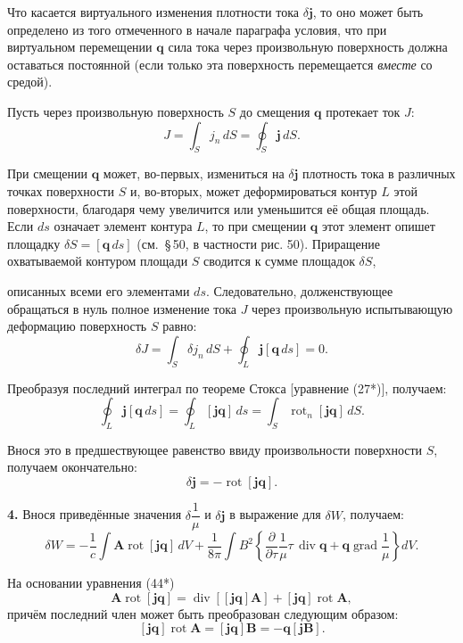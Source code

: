 \documentclass[a4paper,10pt]{article}
\begin{document}
Что касается виртуального изменения плотности тока $\delta\mathbf{j}$,
то оно может быть определено из того отмеченного в начале параграфа
условия, что при виртуальном перемещении $\mathbf{q}$ сила тока через
произвольную поверхность должна оставаться постоянной (если только эта
поверхность перемещается \textit{вместе} со средой).

Пусть через произвольную поверхность $S$ до смещения $\mathbf{q}$
протекает ток $J$:
$$
    J = \int_S j_n\,dS = \oint_S \mathbf{j}\,dS.
$$

При смещении $\mathbf{q}$ может, во-первых, измениться на $\delta\mathbf{j}$
плотность тока в различных точках поверхности $S$ и, во-вторых, может
деформироваться контур $L$ этой поверхности, благодаря чему увеличится
или уменьшится её общая площадь. Если $ds$ означает элемент контура $L$,
то при смещении $\mathbf{q}$ этот элемент опишет площадку $\delta S =
[\mathbf{q}\,ds]$ (см.\ §\,50, в частности рис. 50). Приращение охватываемой
контуром площади $S$ сводится к сумме площадок $\delta S$,


описанных всеми его элементами $ds$. Следовательно, долженствующее
обращаться в нуль полное изменение тока $J$ через произвольную
испытывающую деформацию поверхность $S$ равно:
$$
    \delta J = \int_S \delta j_n\,dS + \oint_L \mathbf{j}[\mathbf{q}\,ds] = 0.
$$

Преобразуя последний интеграл по теореме Стокса [уравнение (27*)],
получаем:
$$
    \oint_L \mathbf{j}[\mathbf{q}\,ds]
    = \oint_L [\mathbf{j}\mathbf{q}]\,ds
    = \int_S \operatorname{rot}_n[\mathbf{j}\mathbf{q}]\,dS.
$$

Внося это в предшествующее равенство ввиду произвольности поверхности
$S$, получаем окончательно:
\begin{equation}
    \delta\mathbf{j} = -\operatorname{rot}[\mathbf{j}\mathbf{q}].
    \tag{83.2}
\end{equation}

\textbf{4.} Внося приведённые значения $\delta\dfrac{1}{\mu}$ и
$\delta\mathbf{j}$ в выражение для $\delta W$, получаем:
$$
    \delta W = -\frac{1}{c}\int\mathbf{A}\operatorname{rot}[\mathbf{j}\mathbf{q}]\,dV
             + \frac{1}{8\pi}\int B^2\!\left\{
                 \frac{\partial}{\partial\tau}\frac{1}{\mu}\tau\,\operatorname{div}\mathbf{q}
                 + \mathbf{q}\operatorname{grad}\frac{1}{\mu}
               \right\}dV.
$$

На основании уравнения (44*)
$$
    \mathbf{A}\operatorname{rot}[\mathbf{j}\mathbf{q}]
    = \operatorname{div}[[\mathbf{j}\mathbf{q}]\mathbf{A}]
    + [\mathbf{j}\mathbf{q}]\operatorname{rot}\mathbf{A},
$$
причём последний член может быть преобразован следующим образом:
$$
    [\mathbf{j}\mathbf{q}]\operatorname{rot}\mathbf{A}
    = [\mathbf{j}\mathbf{q}]\mathbf{B}
    = -\mathbf{q}[\mathbf{j}\mathbf{B}].
$$
\end{document}
